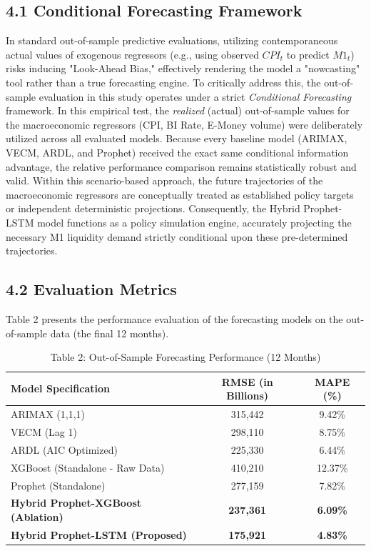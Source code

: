 \documentclass[12pt, letterpaper]{article}
\begin{document}
\subsection*{4.1 Conditional Forecasting Framework}
In standard out-of-sample predictive evaluations, utilizing contemporaneous actual values of exogenous regressors (e.g., using observed $CPI_t$ to predict $M1_t$) risks inducing "Look-Ahead Bias," effectively rendering the model a "nowcasting" tool rather than a true forecasting engine. To critically address this, the out-of-sample evaluation in this study operates under a strict \textit{Conditional Forecasting} framework. In this empirical test, the \textit{realized} (actual) out-of-sample values for the macroeconomic regressors (CPI, BI Rate, E-Money volume) were deliberately utilized across all evaluated models. Because every baseline model (ARIMAX, VECM, ARDL, and Prophet) received the exact same conditional information advantage, the relative performance comparison remains statistically robust and valid. Within this scenario-based approach, the future trajectories of the macroeconomic regressors are conceptually treated as established policy targets or independent deterministic projections. Consequently, the Hybrid Prophet-LSTM model functions as a policy simulation engine, accurately projecting the necessary M1 liquidity demand strictly conditional upon these pre-determined trajectories.

\subsection*{4.2 Evaluation Metrics}
Table 2 presents the performance evaluation of the forecasting models on the out-of-sample data (the final 12 months).

\begin{table}[ht]
\centering
\caption*{Table 2: Out-of-Sample Forecasting Performance (12 Months)}
\begin{tabular}{l c c}
\toprule
\textbf{Model Specification} & \textbf{RMSE (in Billions)} & \textbf{MAPE (\%)} \\
\midrule
ARIMAX (1,1,1) & 315,442 & 9.42\% \\
VECM (Lag 1) & 298,110 & 8.75\% \\
ARDL (AIC Optimized) & 225,330 & 6.44\% \\
XGBoost (Standalone - Raw Data) & 410,210 & 12.37\% \\
Prophet (Standalone) & 277,159 & 7.82\% \\
\textbf{Hybrid Prophet-XGBoost (Ablation)} & \textbf{237,361} & \textbf{6.09\%} \\
\textbf{Hybrid Prophet-LSTM (Proposed)} & \textbf{175,921} & \textbf{4.83\%} \\
\bottomrule
\end{tabular}
\end{table}
\end{document}

